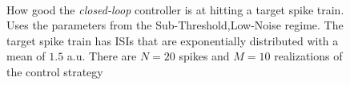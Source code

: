 \documentclass{article}
\begin{document}
\begin{figure}[htp]     
\begin{center}  
\\
  \caption[ ]{How good the {\sl closed-loop} controller is at hitting a target
  spike train. Uses the parameters from the Sub-Threshold,Low-Noise regime. The
  target spike train has ISIs that are exponentially distributed with a
  mean of $1.5$ a.u. There are $N=20$ spikes and $M=10$ realizations of the
  control strategy}
  \label{fig:targettrain_cl_lownoise}  
\end{center}
\end{figure}   
\end{document}
